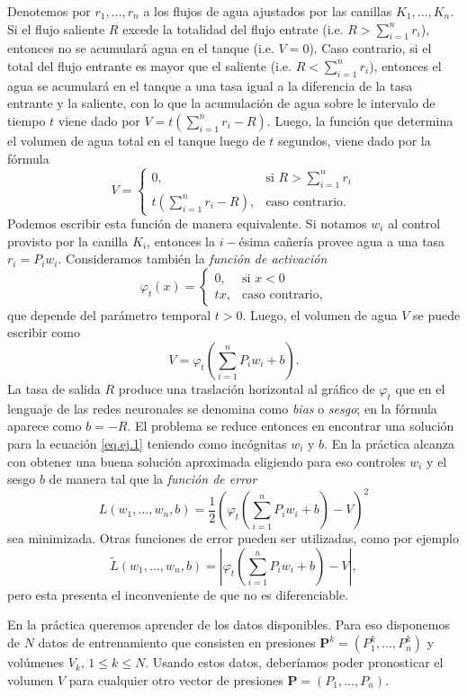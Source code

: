 \documentclass[12pt, a4paper]{amsbook}
\newcommand{\Pb}{{\mathbf P}}
\theoremstyle{remark}
\theoremstyle{definition}
\numberwithin{section}{chapter}
\numberwithin{subsection}{section}
\numberwithin{equation}{section}
\numberwithin{figure}{chapter}
\begin{document}
Denotemos por $r_1,\dots, r_n$ a los flujos de agua ajustados por las canillas $K_1,\dots, K_n$. Si el flujo saliente $R$ excede la totalidad del flujo entrate (i.e. $R>\sum_{i=1}^n r_i$), entonces no se acumulará agua en el tanque (i.e. $V=0$). Caso contrario, si el total del flujo entrante es mayor que el saliente (i.e. $R<\sum_{i=1}^n r_i$), entonces el agua se acumulará en el tanque a una tasa igual a la diferencia de la tasa entrante y la saliente, con lo que la acumulación de agua sobre le intervalo de tiempo $t$ viene dado por $V = t\left(\sum_{i=1}^n r_i - R\right)$. Luego, la función que determina el volumen de agua total en el tanque luego de $t$ segundos, viene dado por la fórmula
$$
V=\begin{cases}
0, & \text{si } R>\sum_{i=1}^n r_i\\
t\left(\sum_{i=1}^n r_i - R\right), & \text{caso contrario.}
\end{cases}
$$
Podemos escribir esta función de manera equivalente. Si notamos $w_i$ al control provisto por la canilla $K_i$, entonces la $i-$ésima cañería provee agua a una tasa $r_i=P_i w_i$. Consideramos también la {\em función de activación}
$$
\varphi_t(x) = \begin{cases}
0, & \text{si } x<0\\
tx, & \text{caso contrario},
\end{cases}
$$
que depende del parámetro temporal $t>0$. Luego, el volumen de agua $V$ se puede escribir como
\begin{equation}\label{eq.ej.1}
V=\varphi_t\left(\sum_{i=1}^n P_i w_i + b\right).
\end{equation}
La tasa de salida $R$ produce una traslación horizontal al gráfico de $\varphi_t$ que en el lenguaje de las redes neuronales se denomina como {\em bias} o {\em sesgo}; en la fórmula aparece como $b=-R$. El problema se reduce entonces en encontrar una solución para la ecuación \eqref{eq.ej.1} teniendo como incógnitas $w_i$ y $b$. En la práctica alcanza con obtener una buena solución aproximada eligiendo para eso controles $w_i$ y el sesgo $b$ de manera tal que la {\em función de error}
$$
L(w_1,\dots,w_n,b) = \frac12 \left(\varphi_t\left(\sum_{i=1}^n P_i w_i + b\right) - V\right)^2
$$
sea minimizada. Otras funciones de error pueden ser utilizadas, como por ejemplo
$$
\tilde L(w_1,\dots,w_n,b) = \left|\varphi_t\left(\sum_{i=1}^n P_i w_i + b\right) - V\right|,
$$
pero esta presenta el inconveniente de que no es diferenciable.

En la práctica queremos aprender de los datos disponibles. Para eso disponemos de $N$ datos de entrenamiento que consisten en presiones $\Pb^k = (P_1^k,\dots,P_n^k)$ y volúmenes $V_k$, $1\le k\le N$. Usando estos datos, deberíamos poder pronosticar el volumen $V$ para cualquier otro vector de presiones $\Pb = (P_1,\dots,P_n)$.
\end{document}
